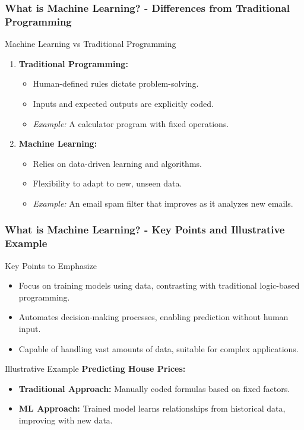 \documentclass[aspectratio=169]{beamer}
\begin{document}
\begin{frame}[fragile]
    \frametitle{What is Machine Learning? - Differences from Traditional Programming}
    \begin{block}{Machine Learning vs Traditional Programming}
        \begin{enumerate}
            \item \textbf{Traditional Programming:}
                \begin{itemize}
                    \item Human-defined rules dictate problem-solving.
                    \item Inputs and expected outputs are explicitly coded.
                    \item \textit{Example:} A calculator program with fixed operations.
                \end{itemize}
                
            \item \textbf{Machine Learning:}
                \begin{itemize}
                    \item Relies on data-driven learning and algorithms.
                    \item Flexibility to adapt to new, unseen data.
                    \item \textit{Example:} An email spam filter that improves as it analyzes new emails.
                \end{itemize}
        \end{enumerate}
    \end{block}
\end{frame}

\begin{frame}[fragile]
    \frametitle{What is Machine Learning? - Key Points and Illustrative Example}
    \begin{block}{Key Points to Emphasize}
        \begin{itemize}
            \item Focus on training models using data, contrasting with traditional logic-based programming.
            \item Automates decision-making processes, enabling prediction without human input.
            \item Capable of handling vast amounts of data, suitable for complex applications.
        \end{itemize}
    \end{block}
    
    \begin{block}{Illustrative Example}
        \textbf{Predicting House Prices:}
        \begin{itemize}
            \item \textbf{Traditional Approach:} Manually coded formulas based on fixed factors.
            \item \textbf{ML Approach:} Trained model learns relationships from historical data, improving with new data.
        \end{itemize}
    \end{block}
\end{frame}
\end{document}
